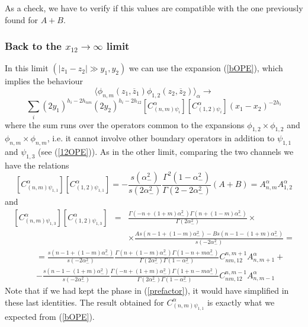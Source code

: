 \documentclass[a4paper,12pt]{report}
\begin{document}
As a check, we have to verify if this values are compatible with the one previously found for $A+B$.


\subsubsection{Back to the $ x_{12}\rightarrow \infty $  limit}

In this limit $\left(\mid z_{1}-z_{2}\mid \gg y_{1},y_{2} \right)$ we can use the expansion (\ref{bOPE}), which
implies the behaviour
\begin{equation}
\langle \phi _{n,m}\left(z_{1},\overline{z}_{1} \right)\phi _{1,2}\left(z_{2},\overline{z}_{2} \right)\rangle
_{\alpha}\rightarrow
\end{equation}
\begin{displaymath}
\sum _{i}\left(2y_{1} \right)^{h_{i}-2h_{nm}}\left(2y_{2}
\right)^{h_{i}-2h_{12}}\left[C_{(n,m)\psi _{i}}^{\alpha} \right]\left[C_{(1,2)\psi _{i}}^{\alpha}
\right]\left(x_{1}-x_{2} \right)^{-2h_{i}}
\end{displaymath}
where the sum runs over the operators common to the expansions $ \phi _{1,2}\times\phi _{1,2}$ and  $ \phi
_{n,m}\times\phi _{n,m}$, i.e. it cannot involve other boundary operators in addition to $\psi _{1,1}$ and $\psi
_{1,3}$ (see (\ref{12OPE})). As in the other limit, comparing the two channels we have the relations
\begin{equation}\label{bstructconst11}
\left[C_{(n,m)\psi _{1,1}}^{\alpha} \right]\left[C_{(1,2)\psi _{1,1}}^{\alpha} \right] =-\frac{s\left(\alpha
_{-}^{2} \right)}{s\left(2\alpha _{-}^{2} \right)}\frac{\Gamma^{2} \left(1-\alpha _{-}^{2} \right)}{\Gamma
\left(2-2\alpha _{-}^{2} \right)}\left(A+B \right)= A_{n,m}^{\alpha}A_{1,2}^{\alpha}
\end{equation}
and
\begin{eqnarray*}\label{bstructconst13}
\left[C_{(n,m)\psi _{1,3}}^{\alpha} \right]\left[C_{(1,2)\psi _{1,3}}^{\alpha} \right] &=&\frac{\Gamma
\left(-n+(1+m)\alpha
_{-}^{2} \right)\Gamma \left(n+(1-m)\alpha _{-}^{2} \right)}{\Gamma \left(2\alpha _{-}^{2} \right)} \times \\
&& \times \frac{As\left(n-1+(1-m)\alpha _{-}^{2} \right)-Bs\left(n-1-(1+m)\alpha _{-}^{2} \right)}{s\left(-2\alpha
_{-}^{2} \right)}=
\end{eqnarray*}
\begin{eqnarray*}
&& =\frac{s\left(n-1+(1-m)\alpha _{-}^{2} \right)}{s\left(-2\alpha _{-}^{2} \right)}\frac{\Gamma
\left(n+(1-m)\alpha _{-}^{2} \right)\Gamma \left(1-n+m\alpha _{-}^{2} \right)}{\Gamma\left(2\alpha _{-}^{2}
\right) \Gamma \left(1-\alpha _{-}^{2} \right)}C_{nm,12}^{n,m+1}A_{n,m+1}^{\alpha}+ \\
&& -\frac{s\left(n-1-(1+m)\alpha _{-}^{2} \right)}{s\left(-2\alpha _{-}^{2} \right)}\frac{\Gamma
\left(-n+(1+m)\alpha _{-}^{2} \right)\Gamma \left(1+n-m\alpha _{-}^{2} \right)}{\Gamma\left(2\alpha _{-}^{2}
\right) \Gamma \left(1-\alpha _{-}^{2} \right)}C_{nm,12}^{n,m-1}A_{n,m-1}^{\alpha}
\end{eqnarray*}
Note that if we had kept the phase in (\ref{prefactor}), it would have simplified in these last identities. The
result obtained for $C_{(n,m)\psi _{1,1}}^{\alpha}$ is exactly what we expected from (\ref{bOPE}).
\end{document}
